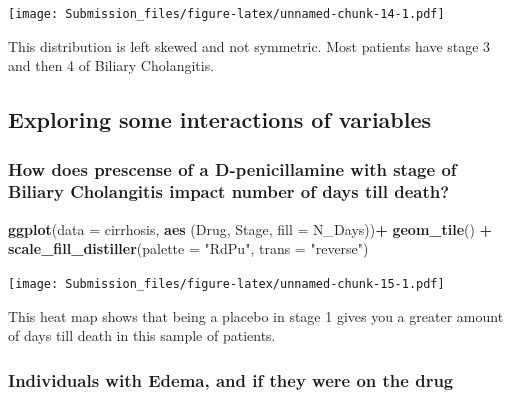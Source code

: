 \documentclass[
]{article}
\newenvironment{Shaded}{\begin{snugshade}}{\end{snugshade}}
\newcommand{\AttributeTok}[1]{\textcolor[rgb]{0.13,0.29,0.53}{#1}}
\newcommand{\FunctionTok}[1]{\textcolor[rgb]{0.13,0.29,0.53}{\textbf{#1}}}
\newcommand{\NormalTok}[1]{#1}
\newcommand{\SpecialCharTok}[1]{\textcolor[rgb]{0.81,0.36,0.00}{\textbf{#1}}}
\newcommand{\StringTok}[1]{\textcolor[rgb]{0.31,0.60,0.02}{#1}}
\begin{document}
\texttt{[image: Submission\_files/figure-latex/unnamed-chunk-14-1.pdf]}

This distribution is left skewed and not symmetric. Most patients have
stage 3 and then 4 of Biliary Cholangitis.

\hypertarget{exploring-some-interactions-of-variables}{%
\subsection{Exploring some interactions of
variables}\label{exploring-some-interactions-of-variables}}

\hypertarget{how-does-prescense-of-a-d-penicillamine-with-stage-of-biliary-cholangitis-impact-number-of-days-till-death}{%
\subsubsection{How does prescense of a D-penicillamine with stage of
Biliary Cholangitis impact number of days till
death?}\label{how-does-prescense-of-a-d-penicillamine-with-stage-of-biliary-cholangitis-impact-number-of-days-till-death}}

\begin{Shaded}
\begin{Highlighting}[]
\FunctionTok{ggplot}\NormalTok{(}\AttributeTok{data =}\NormalTok{ cirrhosis, }\FunctionTok{aes}\NormalTok{ (Drug, Stage, }\AttributeTok{fill =}\NormalTok{ N\_Days))}\SpecialCharTok{+} \FunctionTok{geom\_tile}\NormalTok{() }\SpecialCharTok{+} \FunctionTok{scale\_fill\_distiller}\NormalTok{(}\AttributeTok{palette =} \StringTok{"RdPu"}\NormalTok{, }\AttributeTok{trans =} \StringTok{"reverse"}\NormalTok{) }
\end{Highlighting}
\end{Shaded}

\texttt{[image: Submission\_files/figure-latex/unnamed-chunk-15-1.pdf]}

This heat map shows that being a placebo in stage 1 gives you a greater
amount of days till death in this sample of patients.

\hypertarget{individuals-with-edema-and-if-they-were-on-the-drug}{%
\subsubsection{Individuals with Edema, and if they were on the
drug}\label{individuals-with-edema-and-if-they-were-on-the-drug}}
\end{document}
